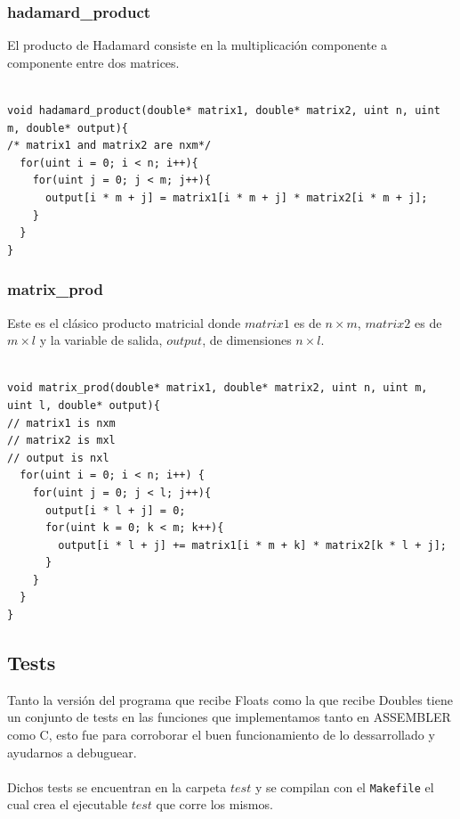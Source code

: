 \subsubsection{hadamard\_product}

El producto de Hadamard consiste en la multiplicación componente a componente entre dos matrices.
\\
\\
\begin{lstlisting}[frame=single]
void hadamard_product(double* matrix1, double* matrix2, uint n, uint m, double* output){
/* matrix1 and matrix2 are nxm*/
  for(uint i = 0; i < n; i++){
    for(uint j = 0; j < m; j++){
      output[i * m + j] = matrix1[i * m + j] * matrix2[i * m + j];
    }
  }
}
\end{lstlisting}

\subsubsection{matrix\_prod}

Este es el clásico producto matricial donde $matrix1$ es de $n \times m$, $matrix2$ es de $m \times l$ y la variable de salida, $output$, de dimensiones $n \times l$.
\\
\\
\begin{lstlisting}[frame=single,xleftmargin=1cm]
void matrix_prod(double* matrix1, double* matrix2, uint n, uint m, uint l, double* output){
// matrix1 is nxm
// matrix2 is mxl
// output is nxl
  for(uint i = 0; i < n; i++) {
    for(uint j = 0; j < l; j++){
      output[i * l + j] = 0;
      for(uint k = 0; k < m; k++){
        output[i * l + j] += matrix1[i * m + k] * matrix2[k * l + j];
      }
    }
  }
}
\end{lstlisting}


\subsection{Tests}

Tanto la versión del programa que recibe Floats como la que recibe Doubles tiene un conjunto de tests en las funciones que implementamos tanto en ASSEMBLER como C, esto fue para corroborar el buen funcionamiento de lo dessarrollado y ayudarnos a debuguear.
\\
\\
Dichos tests se encuentran en la carpeta $test$ y se compilan con el \texttt{Makefile} el cual crea el ejecutable $test$ que corre los mismos.